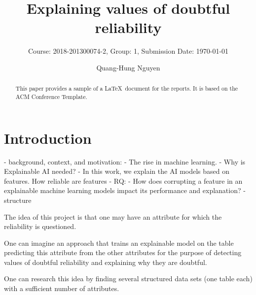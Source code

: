 \documentclass[sigconf]{acmart}
\begin{document}
\title{Explaining values of doubtful reliability}
\subtitle{
Course: 2018-201300074-2, Group: 1, Submission Date: \today \\
}


\author{Quang-Hung Nguyen}


\begin{abstract}
This paper provides a sample of a \LaTeX\ document for the reports. It is based on the ACM Conference Template. 
\end{abstract}
\maketitle

\section{Introduction}
\label{sec:intro}


- background, context, and motivation: 
    - The rise in machine learning. 
    - Why is Explainable AI needed? 
    - In this work, we explain the AI models based on features. How reliable are features
- RQ: 
    - How does corrupting a feature in  an explainable machine learning models impact its performance and explanation? 
- structure 

The idea of this project is that one may have an attribute for which the reliability is questioned. 

One can imagine an approach that trains an explainable model on the table predicting this attribute from the other attributes for the purpose of detecting values of doubtful reliability and explaining why they are doubtful.

One can research this idea by finding several structured data sets (one table each) with a sufficient number of attributes.
\end{document}
